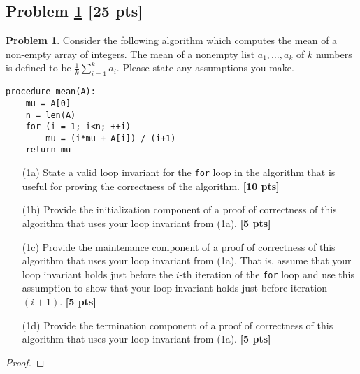\documentclass[11pt]{article}
\theoremstyle{definition}
\theoremstyle{definition}
\newtheorem{required}{Problem}
\theoremstyle{definition}
\begin{document}
\subsection{Problem \ref{LoopInvariant1} \textbf{[25 pts]}}
\begin{required} \label{LoopInvariant1}
Consider the following algorithm which computes the mean of a non-empty array of integers. The mean of a nonempty list \( a_1, \ldots, a_k \) of \( k \) numbers is defined to be \( \frac{1}{k} \sum_{i=1}^{k} a_i \). Please state any assumptions you make.

\begin{verbatim}
procedure mean(A):
    mu = A[0]
    n = len(A)
    for (i = 1; i<n; ++i)
        mu = (i*mu + A[i]) / (i+1)
    return mu
\end{verbatim}

\begin{enumerate}
    \item[(1a)] State a valid loop invariant for the \texttt{for} loop in the algorithm that is useful for proving the correctness of the algorithm. \textbf{[10 pts]}
    \item[(1b)] Provide the initialization component of a proof of correctness of this algorithm that uses your loop invariant from (1a). \textbf{[5 pts]}
    \item[(1c)] Provide the maintenance component of a proof of correctness of this algorithm that uses your loop invariant from (1a). That is, assume that your loop invariant holds just before the $i$-th iteration of the \texttt{for} loop and use this assumption to show that your loop invariant holds just before iteration $(i + 1)$. \textbf{[5 pts]}
    \item[(1d)] Provide the termination component of a proof of correctness of this algorithm that uses your loop invariant from (1a). \textbf{[5 pts]}
\end{enumerate}
\end{required}

\begin{proof}
\end{proof}

\newpage
\end{document}

